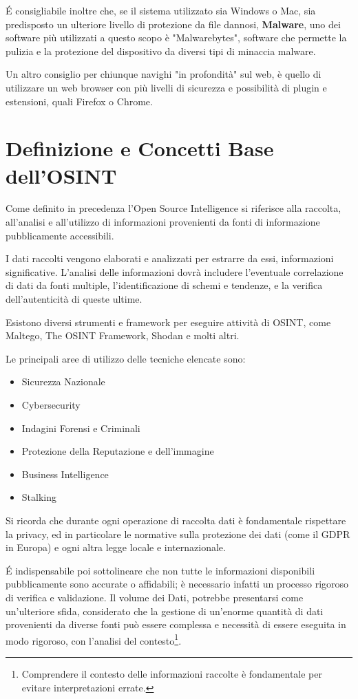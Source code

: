 \'E consigliabile inoltre che, se il sistema utilizzato sia Windows o Mac, sia predisposto un ulteriore livello di protezione da file dannosi, \textbf{Malware}, uno dei software più utilizzati a questo scopo è "Malwarebytes", software che permette la pulizia e la protezione del dispositivo da diversi tipi di minaccia malware.

Un altro consiglio per chiunque navighi "in profondità" sul web, è quello di utilizzare un web browser con più livelli di sicurezza e possibilità di plugin e estensioni, quali Firefox o Chrome.


\section{Definizione e Concetti Base dell'OSINT}\label{sec:cap_sec_osint1}

Come definito in precedenza l'Open Source Intelligence si riferisce alla raccolta, all'analisi e all'utilizzo di informazioni provenienti da fonti di informazione pubblicamente accessibili. 

I dati raccolti vengono elaborati e analizzati per estrarre da essi, informazioni significative. L'analisi delle informazioni dovrà includere l'eventuale correlazione di dati da fonti multiple, l'identificazione di schemi e tendenze, e la verifica dell'autenticità di queste ultime.

Esistono diversi strumenti e framework per eseguire attività di OSINT, come Maltego, The OSINT Framework, Shodan e molti altri.

Le principali aree di utilizzo delle tecniche elencate sono: 

\begin{itemize}
    \item Sicurezza Nazionale
    \item Cybersecurity
    \item Indagini Forensi e Criminali
    \item Protezione della Reputazione e dell'immagine
    \item Business Intelligence
    \item Stalking
\end{itemize}

Si ricorda che durante ogni operazione di raccolta dati è fondamentale rispettare la privacy, ed in particolare le normative sulla protezione dei dati (come il GDPR in Europa) e ogni altra legge locale e internazionale.

\'E indispensabile poi sottolineare che non tutte le informazioni disponibili pubblicamente sono accurate o affidabili; è necessario infatti un processo rigoroso di verifica e validazione. Il volume dei Dati, potrebbe presentarsi come un'ulteriore sfida, considerato che la gestione di un'enorme quantità di dati provenienti da diverse fonti può essere complessa e necessità di essere eseguita in modo rigoroso, con l'analisi del contesto\footnote{Comprendere il contesto delle informazioni raccolte è fondamentale per evitare interpretazioni errate.}.

